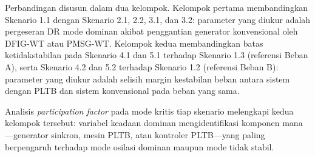 Perbandingan disusun dalam dua kelompok. Kelompok pertama membandingkan
Skenario 1.1 dengan Skenario 2.1, 2.2, 3.1, dan 3.2: parameter yang diukur
adalah pergeseran DR mode dominan akibat penggantian generator konvensional oleh
DFIG-WT atau PMSG-WT. Kelompok kedua membandingkan batas ketidakstabilan pada
Skenario 4.1 dan 5.1 terhadap Skenario 1.3 (referensi Beban A), serta Skenario
4.2 dan 5.2 terhadap Skenario 1.2 (referensi Beban B): parameter yang diukur
adalah selisih margin kestabilan beban antara sistem dengan PLTB dan sistem
konvensional pada beban yang sama.

Analisis \textit{participation factor} pada mode kritis tiap skenario melengkapi
kedua kelompok tersebut: variabel keadaan dominan mengidentifikasi komponen
mana---generator sinkron, mesin PLTB, atau kontroler PLTB---yang paling
berpengaruh terhadap mode osilasi dominan maupun mode tidak stabil.
